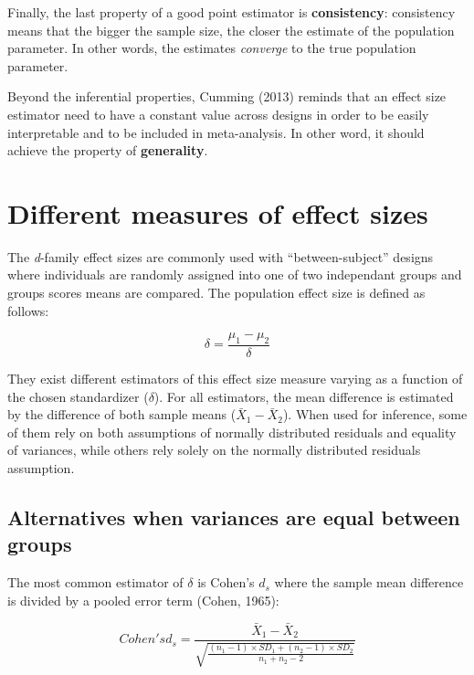 \documentclass[
  man]{apa6}
\begin{document}
Finally, the last property of a good point estimator is \textbf{consistency}: consistency means that the bigger the sample size, the closer the estimate of the population parameter. In other words, the estimates \emph{converge} to the true population parameter.

Beyond the inferential properties, Cumming (2013) reminds that an effect size estimator need to have a constant value across designs in order to be easily interpretable and to be included in meta-analysis. In other word, it should achieve the property of \textbf{generality}.

\hypertarget{different-measures-of-effect-sizes}{%
\section{Different measures of effect sizes}\label{different-measures-of-effect-sizes}}

The \emph{d}-family effect sizes are commonly used with \enquote{between-subject} designs where individuals are randomly assigned into one of two independant groups and groups scores means are compared. The population effect size is defined as follows:

\begin{equation} 
\delta = \frac{\mu_{1}-\mu_{2}}{\delta} 
\label{eq:Cohendelta}
\end{equation}

They exist different estimators of this effect size measure varying as a function of the chosen standardizer (\(\delta\)). For all estimators, the mean difference is estimated by the difference of both sample means (\(\bar{X}_1-\bar{X}_2\)). When used for inference, some of them rely on both assumptions of normally distributed residuals and equality of variances, while others rely solely on the normally distributed residuals assumption.

\hypertarget{alternatives-when-variances-are-equal-between-groups}{%
\subsection{Alternatives when variances are equal between groups}\label{alternatives-when-variances-are-equal-between-groups}}

The most common estimator of \(\delta\) is Cohen's \(d_{s}\) where the sample mean difference is divided by a pooled error term (Cohen, 1965):

\begin{equation} 
Cohen's d_s = \frac{\bar{X}_1-\bar{X}_2}{\sqrt{\frac{(n_1-1) \times SD_1+(n_2-1) \times SD_2}{n_1+n_2-2}}} 
\label{eq:Cohends}
\end{equation}
\end{document}
